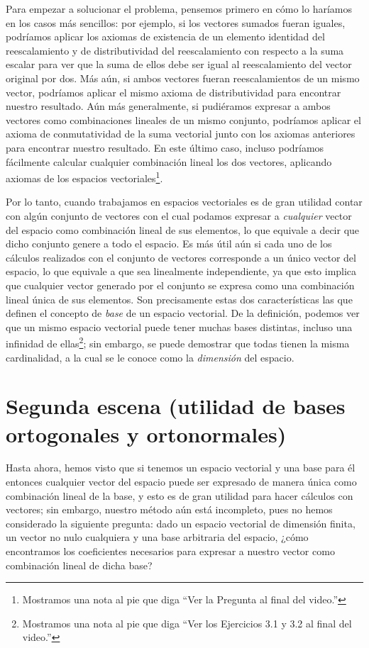 \documentclass[12pt,dvipsnames]{article}
\numberwithin{equation}{section}
\begin{document}
Para empezar a solucionar el problema, pensemos primero en cómo lo haríamos en los casos más sencillos: por ejemplo, si los vectores sumados fueran iguales, podríamos aplicar los axiomas de existencia de un elemento identidad del reescalamiento y de distributividad del reescalamiento con respecto a la suma escalar para ver que la suma de ellos debe ser igual al reescalamiento del vector original por dos. Más aún, si ambos vectores fueran reescalamientos de un mismo vector, podríamos aplicar el mismo axioma de distributividad para encontrar nuestro resultado. Aún más generalmente, si pudiéramos expresar a ambos vectores como combinaciones lineales de un mismo conjunto, podríamos aplicar el axioma de conmutatividad de la suma vectorial junto con los axiomas anteriores para encontrar nuestro resultado. En este último caso, incluso podríamos fácilmente calcular cualquier combinación lineal los dos vectores, aplicando axiomas de los espacios vectoriales\footnote{Mostramos una nota al pie que diga ``Ver la Pregunta al final del video.''}.

Por lo tanto, cuando trabajamos en espacios vectoriales es de gran utilidad contar con algún conjunto de vectores con el cual podamos expresar a \emph{cualquier} vector del espacio como combinación lineal de sus elementos, lo que equivale a decir que dicho conjunto genere a todo el espacio. Es más útil aún si cada uno de los cálculos realizados con el conjunto de vectores corresponde a un único vector del espacio, lo que equivale a que sea linealmente independiente, ya que esto implica que cualquier vector generado por el conjunto se expresa como una combinación lineal única de sus elementos. Son precisamente estas dos características las que definen el concepto de \emph{base} de un espacio vectorial. De la definición, podemos ver que un mismo espacio vectorial puede tener muchas bases distintas, incluso una infinidad de ellas\footnote{Mostramos una nota al pie que diga ``Ver los Ejercicios 3.1 y 3.2 al final del video.''}; sin embargo, se puede demostrar que todas tienen la misma cardinalidad, a la cual se le conoce como la \emph{dimensión} del espacio. \\

\newpage
\section{Segunda escena (utilidad de bases ortogonales y ortonormales)}

Hasta ahora, hemos visto que si tenemos un espacio vectorial y una base para él entonces cualquier vector del espacio puede ser expresado de manera única como combinación lineal de la base, y esto es de gran utilidad para hacer cálculos con vectores; sin embargo, nuestro método aún está incompleto, pues no hemos considerado la siguiente pregunta: dado un espacio vectorial de dimensión finita, un vector no nulo cualquiera y una base arbitraria del espacio, ¿cómo encontramos los coeficientes necesarios para expresar a nuestro vector como combinación lineal de dicha base?
\end{document}
